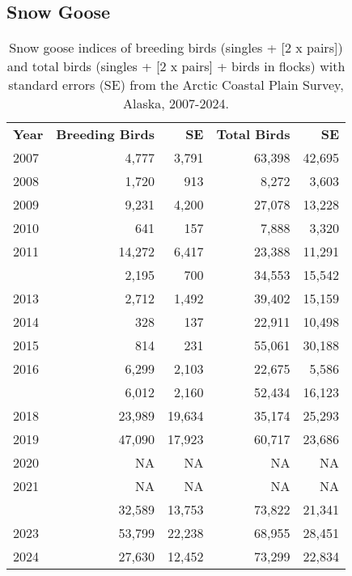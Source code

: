 \documentclass[
]{article}
\begin{document}
\newpage{}

\subsection*{Snow Goose}\label{snow-goose-1}

\begingroup\fontsize{10}{12}\selectfont

\begin{longtable}[t]{lrrrr}

\caption{\label{tbl-SNGO}Snow goose indices of breeding birds (singles +
{[}2 x pairs{]}) and total birds (singles + {[}2 x pairs{]} + birds in
flocks) with standard errors (SE) from the Arctic Coastal Plain Survey,
Alaska, 2007-2024.}

\tabularnewline

\\
\toprule
\textbf{Year} & \textbf{Breeding Birds} & \textbf{SE} & \textbf{Total Birds} & \textbf{SE}\\
\midrule
2007 & 4,777 & 3,791 & 63,398 & 42,695\\
2008 & 1,720 & 913 & 8,272 & 3,603\\
2009 & 9,231 & 4,200 & 27,078 & 13,228\\
2010 & 641 & 157 & 7,888 & 3,320\\
2011 & 14,272 & 6,417 & 23,388 & 11,291\\
\addlinespace
2012 & 2,195 & 700 & 34,553 & 15,542\\
2013 & 2,712 & 1,492 & 39,402 & 15,159\\
2014 & 328 & 137 & 22,911 & 10,498\\
2015 & 814 & 231 & 55,061 & 30,188\\
2016 & 6,299 & 2,103 & 22,675 & 5,586\\
\addlinespace
2017 & 6,012 & 2,160 & 52,434 & 16,123\\
2018 & 23,989 & 19,634 & 35,174 & 25,293\\
2019 & 47,090 & 17,923 & 60,717 & 23,686\\
2020 & NA & NA & NA & NA\\
2021 & NA & NA & NA & NA\\
\addlinespace
2022 & 32,589 & 13,753 & 73,822 & 21,341\\
2023 & 53,799 & 22,238 & 68,955 & 28,451\\
2024 & 27,630 & 12,452 & 73,299 & 22,834\\
\bottomrule

\end{longtable}
\end{document}
